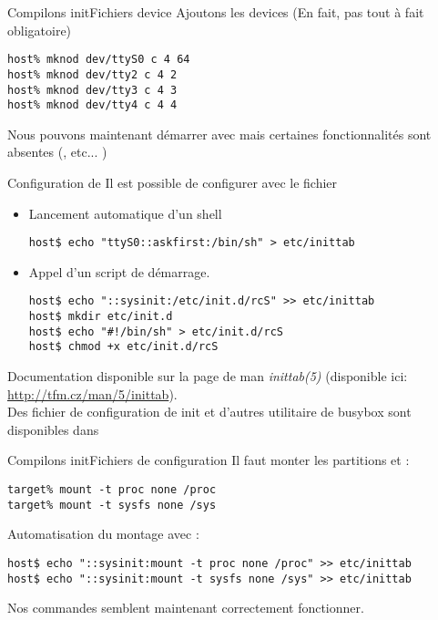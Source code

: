\begin{frame}[fragile=singleslide]{Compilons init}{Fichiers device}
  Ajoutons  les devices    (En fait,  pas  tout à  fait
  obligatoire)
  \begin{lstlisting}
host% mknod dev/ttyS0 c 4 64
host% mknod dev/tty2 c 4 2
host% mknod dev/tty3 c 4 3
host% mknod dev/tty4 c 4 4
  \end{lstlisting}
  Nous  pouvons  maintenant  démarrer avec    mais
  certaines fonctionnalités sont absentes (, etc... )
\end{frame}

\begin{frame}[fragile=singleslide]{Configuration de }
  Il est possible de configurer  avec le fichier
  \begin{itemize}
  \item Lancement automatique d'un shell
    \begin{lstlisting}
host$ echo "ttyS0::askfirst:/bin/sh" > etc/inittab
    \end{lstlisting}
  \item Appel d'un script de démarrage.
    \begin{lstlisting}
host$ echo "::sysinit:/etc/init.d/rcS" >> etc/inittab
host$ mkdir etc/init.d
host$ echo "#!/bin/sh" > etc/init.d/rcS
host$ chmod +x etc/init.d/rcS
    \end{lstlisting}
  \end{itemize}
  Documentation disponible sur la page de man \emph{inittab(5)}
  (disponible ici: \url{http://tfm.cz/man/5/inittab}).\\[2ex]
  Des  fichier de  configuration  de init  et  d'autres utilitaire  de
  busybox sont disponibles dans 
\end{frame}

\begin{frame}[fragile=singleslide]{Compilons init}{Fichiers de configuration}
  Il faut monter les partitions  et :
  \begin{lstlisting}
target% mount -t proc none /proc
target% mount -t sysfs none /sys
  \end{lstlisting}
  Automatisation du montage avec :
  \begin{lstlisting}
host$ echo "::sysinit:mount -t proc none /proc" >> etc/inittab
host$ echo "::sysinit:mount -t sysfs none /sys" >> etc/inittab
  \end{lstlisting}
  Nos commandes semblent maintenant correctement fonctionner.
\end{frame}

